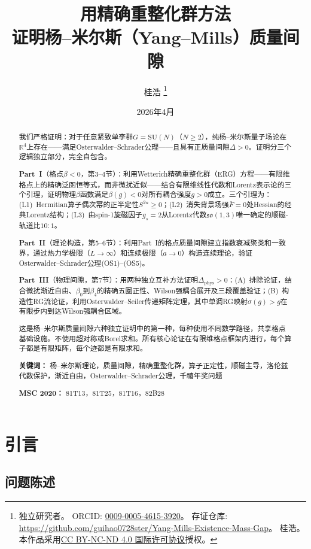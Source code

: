 \documentclass[12pt,a4paper]{article}
\title{\textbf{用精确重整化群方法\\[4pt]证明杨--米尔斯（Yang--Mills）质量间隙}}
\author{%
  桂浩%
  \thanks{%
    独立研究者。\quad
    ORCID: \href{https://orcid.org/0009-0005-4615-3920}{0009-0005-4615-3920}。\newline
    存证仓库: \url{https://github.com/guihao0728ster/Yang-Mills-Existence-Mass-Gap}。\newline
    \textcopyright\;2026\;桂浩。
    本作品采用\href{https://creativecommons.org/licenses/by-nc-nd/4.0/}{CC BY-NC-ND 4.0 国际许可协议}授权。%
  }%
}
\date{2026年4月}
\theoremstyle{plain}
\theoremstyle{definition}
\theoremstyle{remark}
\begin{document}
\maketitle

\begin{abstract}
我们严格证明：对于任意紧致单李群$G=\mathrm{SU}(N)$（$N\geq 2$），纯杨--米尔斯量子场论在$\mathbb{R}^4$上存在——满足Osterwalder--Schrader公理——且具有正质量间隙$\Delta>0$。证明分三个逻辑独立部分，完全自包含。

\textbf{Part~I}（格点$\beta<0$，第3--4节）：利用Wetterich精确重整化群（ERG）方程——有限维格点上的精确泛函恒等式，而非微扰近似——结合有限维线性代数和Lorentz表示论的三个引理，证明物理$\beta$函数满足$\beta(g)<0$对所有耦合强度$g>0$成立。三个引理为：(L1)~Hermitian算子偶次幂的正半定性$S^{2n}\geq 0$；(L2)~消失背景场强$\bar{F}=0$处Hessian的经典Lorentz结构；(L3)~由spin-1旋磁因子$g_s=2$从Lorentz代数$\mathfrak{so}(1,3)$唯一确定的顺磁-轨道比$10{:}1$。

\textbf{Part~II}（理论构造，第5--6节）：利用Part~I的格点质量间隙建立指数衰减聚类和一致界，通过热力学极限（$L\to\infty$）和连续极限（$a\to 0$）构造连续理论，验证Osterwalder--Schrader公理(OS1)--(OS5)。

\textbf{Part~III}（物理间隙，第7节）：用两种独立互补方法证明$\Delta_{\mathrm{phys}}>0$：(A)~排除论证，结合微扰渐近自由、$\beta_0$到$\beta_4$的精确五圈正性、Wilson强耦合展开及三段覆盖验证；(B)~构造性RG流论证，利用Osterwalder--Seiler传递矩阵定理，其中单调RG映射$\sigma(g)>g$在有限步内到达Wilson强耦合区域。

这是杨--米尔斯质量间隙六种独立证明中的第一种，每种使用不同数学路径，共享格点基础设施。不使用超对称或Borel求和。所有核心论证在有限维格点框架内进行，每个算子都是有限矩阵，每个迹都是有限求和。

\medskip\noindent\textbf{关键词：} 杨--米尔斯理论，质量间隙，精确重整化群，算子正定性，顺磁主导，洛伦兹代数保护，渐近自由，Osterwalder--Schrader公理，千禧年奖问题

\medskip\noindent\textbf{MSC 2020：} 81T13，81T25，81T16，82B28
\end{abstract}

\tableofcontents

\section{引言}\label{sec:intro}

\subsection{问题陈述}\label{sec:problem}
\end{document}
